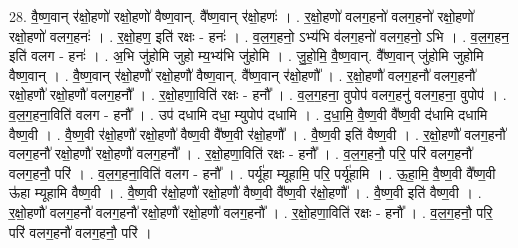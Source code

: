 \documentclass[17pt]{extarticle}
\begin{document}
28. वै॒ष्ण॒वान् र॑क्षो॒हणो॑ रक्षो॒हणो॑ वैष्ण॒वान्. वै᳚ष्ण॒वान् र॑क्षो॒हणः॑ । . र॒क्षो॒हणो॑ वलग॒हनो॑ वलग॒हनो॑ रक्षो॒हणो॑ रक्षो॒हणो॑ वलग॒हनः॑ । . र॒क्षो॒हण॒ इति॑ रक्षः - हनः॑ । . व॒ल॒ग॒हनो॒ ऽभ्य॑भि व॑लग॒हनो॑ वलग॒हनो॒ ऽभि । . व॒ल॒ग॒हन॒ इति॑ वलग - हनः॑ । . अ॒भि जु॑होमि जुहो म्य॒भ्य॑भि जु॑होमि । . जु॒हो॒मि॒ वै॒ष्ण॒वान्. वै᳚ष्ण॒वान् जु॑होमि जुहोमि वैष्ण॒वान् । . वै॒ष्ण॒वान् र॑क्षो॒हणौ॑ रक्षो॒हणौ॑ वैष्ण॒वान्. वै᳚ष्ण॒वान् र॑क्षो॒हणौ᳚ । . र॒क्षो॒हणौ॑ वलग॒हनौ॑ वलग॒हनौ॑ रक्षो॒हणौ॑ रक्षो॒हणौ॑ वलग॒हनौ᳚ । . र॒क्षो॒हणा॒विति॑ रक्षः - हनौ᳚ । . व॒ल॒ग॒हना॒ वुपोप॑ वलग॒हनु॑ वलग॒हना॒ वुपोप॑ । . व॒ल॒ग॒हना॒विति॑ वलग - हनौ᳚ । . उप॑ दधामि दधा॒ म्युपोप॑ दधामि । . द॒धा॒मि॒ वै॒ष्ण॒वी वै᳚ष्ण॒वी द॑धामि दधामि वैष्ण॒वी । . वै॒ष्ण॒वी र॑क्षो॒हणौ॑ रक्षो॒हणौ॑ वैष्ण॒वी वै᳚ष्ण॒वी र॑क्षो॒हणौ᳚ । . वै॒ष्ण॒वी इति॑ वैष्ण॒वी । . र॒क्षो॒हणौ॑ वलग॒हनौ॑ वलग॒हनौ॑ रक्षो॒हणौ॑ रक्षो॒हणौ॑ वलग॒हनौ᳚ । . र॒क्षो॒हणा॒विति॑ रक्षः - हनौ᳚ । . व॒ल॒ग॒हनौ॒ परि॒ परि॑ वलग॒हनौ॑ वलग॒हनौ॒ परि॑ । . व॒ल॒ग॒हना॒विति॑ वलग - हनौ᳚ । . पर्यू॑हा म्यूहामि॒ परि॒ पर्यू॑हामि । . ऊ॒हा॒मि॒ वै॒ष्ण॒वी वै᳚ष्ण॒वी ऊ॑हा म्यूहामि वैष्ण॒वी । . वै॒ष्ण॒वी र॑क्षो॒हणौ॑ रक्षो॒हणौ॑ वैष्ण॒वी वै᳚ष्ण॒वी र॑क्षो॒हणौ᳚ । . वै॒ष्ण॒वी इति॑ वैष्ण॒वी । . र॒क्षो॒हणौ॑ वलग॒हनौ॑ वलग॒हनौ॑ रक्षो॒हणौ॑ रक्षो॒हणौ॑ वलग॒हनौ᳚ । . र॒क्षो॒हणा॒विति॑ रक्षः - हनौ᳚ । . व॒ल॒ग॒हनौ॒ परि॒ परि॑ वलग॒हनौ॑ वलग॒हनौ॒ परि॑ । \newline
\end{document}
